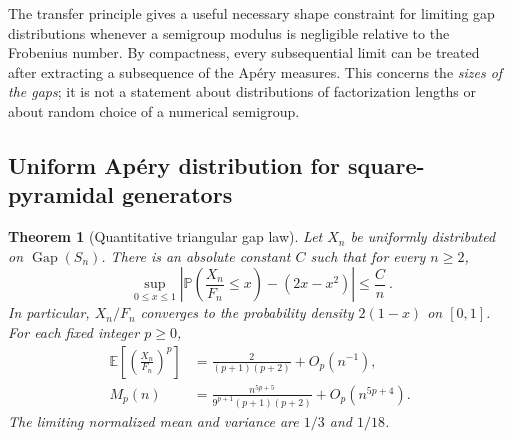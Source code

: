 \documentclass[11pt,a4paper]{article}
\numberwithin{equation}{section}
\newtheorem{theorem}{Theorem}[section]
\theoremstyle{definition}
\newcommand{\Gap}{\operatorname{Gap}}
\newcommand{\E}{\mathbb E}
\newcommand{\Prob}{\mathbb P}
\begin{document}
The transfer principle gives a useful necessary shape constraint for
limiting gap distributions whenever a semigroup modulus is negligible
relative to the Frobenius number. By compactness, every subsequential
limit can be treated after extracting a subsequence of the Ap\'ery
measures. This concerns the \emph{sizes of the gaps}; it is not a
statement about distributions of factorization lengths or about random
choice of a numerical semigroup.

\subsection{Uniform Ap\'ery distribution for square-pyramidal generators}

\begin{theorem}[Quantitative triangular gap law]\label{pyf:thm:triangular}
Let $X_n$ be uniformly distributed on $\Gap(S_n)$. There is an absolute
constant $C$ such that for every $n\geq2$,
\begin{equation}\label{pyf:eq:triangle}
\boxed{\ \sup_{0\leq x\leq1}
\left|\Prob\!\left(\frac{X_n}{F_n}\leq x\right)-(2x-x^2)\right|
\leq\frac Cn\ }.
\end{equation}
In particular, $X_n/F_n$ converges to the probability density
$2(1-x)$ on $[0,1]$. For each fixed integer $p\geq0$,
\begin{align}
\E\left[\left(\frac{X_n}{F_n}\right)^p\right]
 &=\frac{2}{(p+1)(p+2)}+O_p(n^{-1}),\label{pyf:eq:normalizedmom}\\
M_p(n)&=\frac{n^{5p+5}}{9^{p+1}(p+1)(p+2)}
           +O_p(n^{5p+4}).\label{pyf:eq:momasympt}
\end{align}
The limiting normalized mean and variance are $1/3$ and $1/18$.
\end{theorem}
\end{document}

